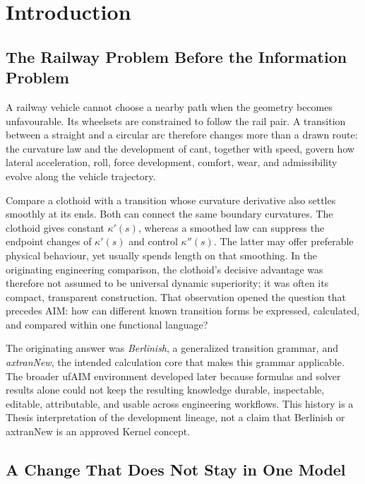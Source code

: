 
\chapter{Introduction}

\section{The Railway Problem Before the Information Problem}

A railway vehicle cannot choose a nearby path when the geometry becomes
unfavourable. Its wheelsets are constrained to follow the rail pair. A
transition between a straight and a circular arc therefore changes more than a
drawn route: the curvature law and the development of cant, together with
speed, govern how lateral acceleration, roll, force development, comfort, wear,
and admissibility evolve along the vehicle trajectory.

Compare a clothoid with a transition whose curvature derivative also settles
smoothly at its ends. Both can connect the same boundary curvatures. The
clothoid gives constant \(\kappa'(s)\), whereas a smoothed law can suppress the
endpoint changes of \(\kappa'(s)\) and control \(\kappa''(s)\). The latter may
offer preferable physical behaviour, yet usually spends length on that
smoothing. In the originating engineering comparison, the clothoid's decisive
advantage was therefore not assumed to be universal dynamic superiority; it
was often its compact, transparent construction. That observation opened the
question that precedes AIM: how can different known transition forms be
expressed, calculated, and compared within one functional language?

The originating answer was \emph{Berlinish}, a generalized transition grammar,
and \emph{axtranNew}, the intended calculation core that makes this grammar
applicable. The broader ufAIM environment developed later because formulas and
solver results alone could not keep the resulting knowledge durable,
inspectable, editable, attributable, and usable across engineering workflows.
This history is a Thesis interpretation of the development lineage, not a
claim that Berlinish or axtranNew is an approved Kernel concept.

\section{A Change That Does Not Stay in One Model}

